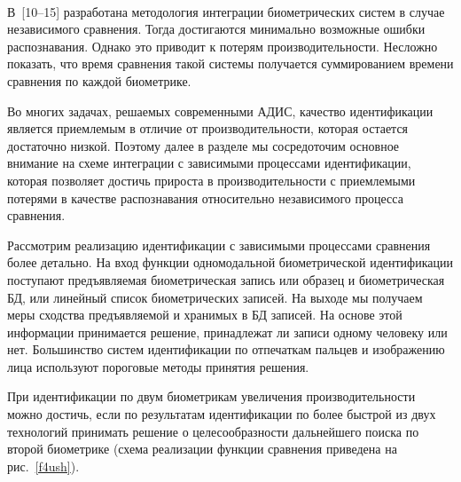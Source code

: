 \begin{multicols}{2}
\begin{figure*} %
\vspace*{1pt}
\begin{center}
\mbox{%
\epsfxsize=145.046mm
}
\end{center}
\vspace*{-9pt}
     \end{figure*}
     

     В~[10--15] разработана методология интеграции биометрических систем в случае 
независимого сравнения. Тогда достигаются минимально возможные ошибки 
распознавания. Однако это приводит к потерям производительности. Несложно 
показать, что время сравнения такой системы получается суммированием времени 
сравнения по каж\-дой биометрике.
     
     Во многих задачах, решаемых современными АДИС, качество идентификации 
является приемлемым в отличие от производительности, которая остается достаточно 
низкой. Поэтому далее в разделе мы сосредоточим основное внимание на схеме 
интеграции с зависимыми процессами идентификации, которая позволяет достичь 
прироста в производительности с приемлемыми потерями в качестве распознавания 
относительно независимого процесса сравнения.
     
     Рассмотрим реализацию идентификации с зависимыми процессами сравнения 
более детально. На вход функции одномодальной био\-мет\-ри\-че\-ской идентификации 
поступают предъявляемая био\-мет\-ри\-че\-ская запись или образец и био\-мет\-ри\-че\-ская 
БД, или линейный список био\-мет\-ри\-че\-ских записей. На выходе мы получаем 
меры сходства предъ\-яв\-ля\-емой и хранимых в БД записей. На основе этой информации 
принимается решение, принадлежат ли записи одному человеку или нет. Большинство 
систем идентификации по отпечаткам пальцев и изображению лица используют 
пороговые методы принятия решения.
     

     При идентификации по двум био\-мет\-ри\-кам увеличения производительности можно достичь, 
если по результатам идентификации по более быст\-рой из двух технологий принимать 
решение о целе\-со\-об\-раз\-ности дальнейшего поиска по второй био\-мет\-ри\-ке (схема 
реализации функции сравнения приведена на рис.~\ref{f4ush}). 



\end{multicols}
